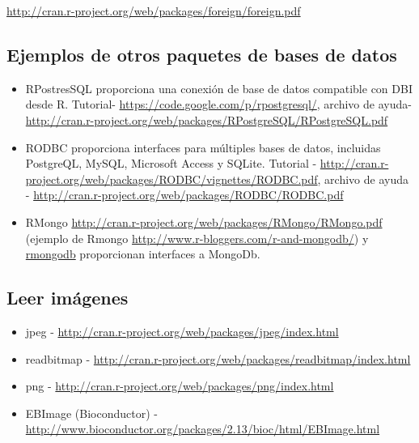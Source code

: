 \documentclass[
]{article}
\providecommand{\tightlist}{%
  \setlength{\itemsep}{0pt}\setlength{\parskip}{0pt}}
\begin{document}
\url{http://cran.r-project.org/web/packages/foreign/foreign.pdf}

\hypertarget{ejemplos-de-otros-paquetes-de-bases-de-datos}{%
\subsection{Ejemplos de otros paquetes de bases de
datos}\label{ejemplos-de-otros-paquetes-de-bases-de-datos}}

\begin{itemize}
\tightlist
\item
  RPostresSQL proporciona una conexión de base de datos compatible con
  DBI desde R. Tutorial- \url{https://code.google.com/p/rpostgresql/},
  archivo de ayuda-
  \url{http://cran.r-project.org/web/packages/RPostgreSQL/RPostgreSQL.pdf}
\item
  RODBC proporciona interfaces para múltiples bases de datos, incluidas
  PostgreQL, MySQL, Microsoft Access y SQLite. Tutorial -
  \href{http://cran.r-project.org/web/packages/RODBC/vignettes/RODBC.\%20pdf}{http://cran.r-project.org/web/packages/RODBC/vignettes/RODBC.pdf},
  archivo de ayuda -
  \href{http://cran.r-project.org/web/packages/RODBC/RODBC.\%20pdf}{http://cran.r-project.org/web/packages/RODBC/RODBC.pdf}
\item
  RMongo \url{http://cran.r-project.org/web/packages/RMongo/RMongo.pdf}
  (ejemplo de Rmongo \url{http://www.r-bloggers.com/r-and-mongodb/}) y
  \href{http:\%20//cran.r-project.org/web/packages/rmongodb/rmongodb.pdf}{rmongodb}
  proporcionan interfaces a MongoDb.
\end{itemize}

\hypertarget{leer-imuxe1genes}{%
\subsection{Leer imágenes}\label{leer-imuxe1genes}}

\begin{itemize}
\tightlist
\item
  jpeg - \url{http://cran.r-project.org/web/packages/jpeg/index.html}
\item
  readbitmap -
  \url{http://cran.r-project.org/web/packages/readbitmap/index.html}
\item
  png - \url{http://cran.r-project.org/web/packages/png/index.html}
\item
  EBImage (Bioconductor) -
  \href{http://www.bioconductor.org/packages/2.13/bioc/html/EBImage.\%20html}{http://www.bioconductor.org/packages/2.13/bioc/html/EBImage.html}
\end{itemize}
\end{document}
